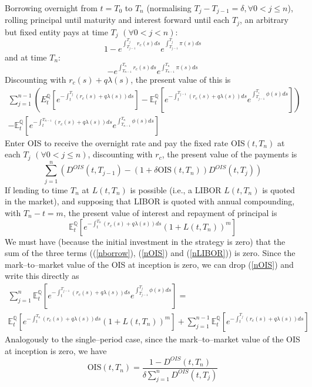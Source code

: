 \documentclass[12pt,a4paper]{article}
\theoremstyle{plain}
\numberwithin{equation}{section}
\begin{document}
Borrowing overnight from $t=T_0$ to $T_n$ (normalising $T_j-T_{j-1}=\delta, \forall 0<j\leq n$), rolling principal until maturity and interest forward until each $T_j$, an arbitrary but fixed entity pays at time $T_j$ $(\forall 0<j<n)$:
\begin{equation}
1-e^{\int_{T_{j-1}}^{T_j}r_c(s)ds}e^{\int_{T_{j-1}}^{T_j}\pi(s)ds}
\end{equation}
and at time $T_n$:
\begin{equation}
-e^{\int_{T_{n-1}}^{T_n}r_c(s)ds}e^{\int_{T_{n-1}}^{T_n}\pi(s)ds}
\end{equation}
Discounting with $r_c(s)+q\lambda(s)$, the present value of this is
\begin{multline}
\sum_{j=1}^{n-1}\left(E_t^\mathbb{Q}\left[e^{-\int_t^{T_{j}}(r_c(s)+q\lambda(s))ds}\right]
-\mathbb{E}_t^\mathbb{Q}\left[e^{-\int_t^{T_{j-1}}(r_c(s)+q\lambda(s))ds}e^{\int_{T_{j-1}}^{T_i}\phi(s)ds}\right]\right) \label{nborrow} \\
-\mathbb{E}_t^\mathbb{Q}\left[e^{-\int_t^{T_{n-1}}(r_c(s)+q\lambda(s))ds}e^{\int_{T_{n-1}}^{T_n}\phi(s)ds}\right]
\end{multline}
Enter OIS to receive the overnight rate and pay the fixed rate $\text{OIS}(t,T_n)$ at each $T_j$ $(\forall 0<j\leq n)$, discounting with $r_c$, the present value of the payments is
\begin{equation}
\sum_{j=1}^{n}(D^{OIS}(t,T_{j-1})-(1+\delta\text{OIS}(t,T_n))D^{OIS}(t,T_j)) \label{nOIS}
\end{equation}
If lending to time $T_n$ at $L(t,T_n)$ is possible (i.e., a LIBOR $L(t,T_n)$ is quoted in the market), and supposing that LIBOR is quoted with annual compounding, with $T_n-t=m$, the present value of interest and repayment of principal is
\begin{equation}
\mathbb{E}_t^\mathbb{Q}\left[e^{-\int_t^{T_{n}}(r_c(s)+q\lambda(s))ds}(1+L(t,T_n))^m\right] \label{nLIBOR}
\end{equation}
We must have (because the initial investment in the strategy is zero) that the sum of the three terms ((\ref{nborrow}), (\ref{nOIS}) and (\ref{nLIBOR})) is zero. Since the mark--to--market value of the OIS at inception is zero, we can drop (\ref{nOIS}) and write this directly as
\begin{multline} \label{nnoarb}
\sum_{j=1}^{n}\mathbb{E}_t^\mathbb{Q}\left[e^{-\int_t^{T_{j-1}}(r_c(s)+q\lambda(s))ds}e^{\int_{T_{j-1}}^{T_j}\phi(s)ds}\right]=\\
\mathbb{E}_t^\mathbb{Q}\left[e^{-\int_t^{T_{n}}(r_c(s)+q\lambda(s))ds}(1+L(t,T_n))^m\right]
+\sum_{j=1}^{n-1}\mathbb{E}_t^\mathbb{Q}\left[e^{-\int_t^{T_{j}}(r_c(s)+q\lambda(s))ds}\right]
\end{multline}
Analogously to the single--period case, since the mark--to--market value of the OIS at inception is zero, we have
\begin{equation}\label{DOISmult}
\text{OIS}(t,T_n)=\frac{1-D^{OIS}(t,T_n)}{\delta\sum_{j=1}^{n}D^{OIS}(t,T_j)}
\end{equation}
\end{document}
